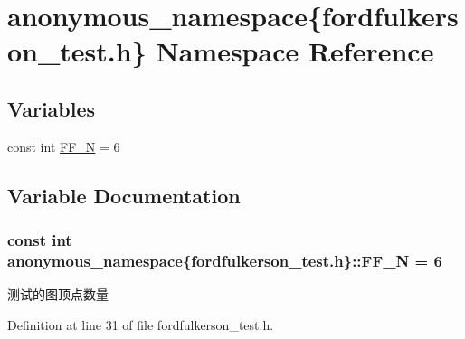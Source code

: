 \hypertarget{namespaceanonymous__namespace_02fordfulkerson__test_8h_03}{}\section{anonymous\+\_\+namespace\{fordfulkerson\+\_\+test.\+h\} Namespace Reference}
\label{namespaceanonymous__namespace_02fordfulkerson__test_8h_03}
\subsection*{Variables}
\begin{DoxyCompactItemize}
\item 
const int \hyperlink{namespaceanonymous__namespace_02fordfulkerson__test_8h_03_aa80d7900226e7b387ace836fd821709e}{F\+F\+\_\+\+N} = 6
\end{DoxyCompactItemize}


\subsection{Variable Documentation}
\hypertarget{namespaceanonymous__namespace_02fordfulkerson__test_8h_03_aa80d7900226e7b387ace836fd821709e}{}
\subsubsection[{F\+F\+\_\+\+N}]{\setlength{\rightskip}{0pt plus 5cm}const int anonymous\+\_\+namespace\{fordfulkerson\+\_\+test.\+h\}\+::F\+F\+\_\+\+N = 6}\label{namespaceanonymous__namespace_02fordfulkerson__test_8h_03_aa80d7900226e7b387ace836fd821709e}
测试的图顶点数量 

Definition at line 31 of file fordfulkerson\+\_\+test.\+h.

